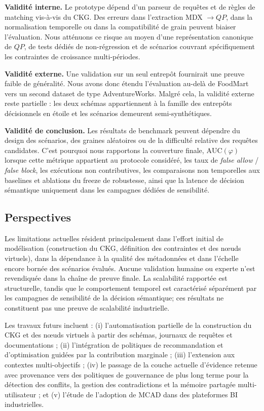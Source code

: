 \documentclass[journal]{IEEEtran}
\begin{document}
\textbf{Validité interne.} Le prototype dépend d'un parseur de requêtes et de règles de matching vis-à-vis du CKG. Des erreurs dans l'extraction MDX $\rightarrow QP$, dans la normalisation temporelle ou dans la compatibilité de grain peuvent biaiser l'évaluation. Nous atténuons ce risque au moyen d'une représentation canonique de $QP$, de tests dédiés de non-régression et de scénarios couvrant spécifiquement les contraintes de croissance multi-périodes.

\textbf{Validité externe.} Une validation sur un seul entrepôt fournirait une preuve faible de généralité. Nous avons donc étendu l'évaluation au-delà de FoodMart vers un second dataset de type AdventureWorks. Malgré cela, la validité externe reste partielle : les deux schémas appartiennent à la famille des entrepôts décisionnels en étoile et les scénarios demeurent semi-synthétiques.

\textbf{Validité de conclusion.} Les résultats de benchmark peuvent dépendre du design des scénarios, des graines aléatoires ou de la difficulté relative des requêtes candidates. C'est pourquoi nous rapportons la couverture finale, $\mathrm{AUC}(\varphi)$ lorsque cette métrique appartient au protocole considéré, les taux de \emph{false allow} / \emph{false block}, les exécutions non contributives, les comparaisons non temporelles aux baselines et ablations du freeze de robustesse, ainsi que la latence de décision sémantique uniquement dans les campagnes dédiées de sensibilité.

\subsection{Perspectives}

Les limitations actuelles résident principalement dans l'effort initial de modélisation (construction du CKG, définition des contraintes et des nœuds virtuels), dans la dépendance à la qualité des métadonnées et dans l'échelle encore bornée des scénarios évalués. Aucune validation humaine ou experte n'est revendiquée dans la chaîne de preuve finale. La scalabilité rapportée est structurelle, tandis que le comportement temporel est caractérisé séparément par les campagnes de sensibilité de la décision sémantique; ces résultats ne constituent pas une preuve de scalabilité industrielle.

Les travaux futurs incluent : (i) l'automatisation partielle de la construction du CKG et des nœuds virtuels à partir des schémas, journaux de requêtes et documentations ; (ii) l'intégration de politiques de recommandation et d'optimisation guidées par la contribution marginale ; (iii) l'extension aux contextes multi-objectifs ; (iv) le passage de la couche actuelle d'évidence retenue avec provenance vers des politiques de gouvernance de plus long terme pour la détection des conflits, la gestion des contradictions et la mémoire partagée multi-utilisateur ; et (v) l'étude de l'adoption de MCAD dans des plateformes BI industrielles.
\end{document}
